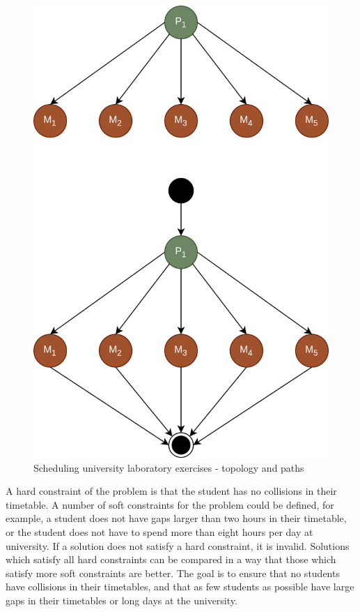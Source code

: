 \begin{figure}[!htbp]
	\centering
	\includegraphics[scale=0.3]{../images/case_study_lab.png}
	\caption{Scheduling university laboratory exercises - topology and paths}
    \label{fig:case_study_lab}
\end{figure}

A hard constraint of the problem is that the student has no collisions in their timetable. A number of soft constraints for the problem could be defined, for example, a student does not have gaps larger than two hours in their timetable, or the student does not have to spend more than eight hours per day at university. If a solution does not satisfy a hard constraint, it is invalid. Solutions which satisfy all hard constraints can be compared in a way that those which satisfy more soft constraints are better. The goal is to ensure that no students have collisions in their timetables, and that as few students as possible have large gaps in their timetables or long days at the university.

